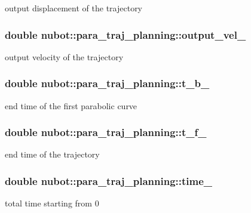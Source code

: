 output displacement of the trajectory 

\hypertarget{group__nubot_gae57f0165c2b073b880bf4827bdd76204}{
\subsubsection[{output\-\_\-vel\-\_\-}]{\setlength{\rightskip}{0pt plus 5cm}double nubot\-::para\-\_\-traj\-\_\-planning\-::output\-\_\-vel\-\_\-\hspace{0.3cm}{\ttfamily [private]}}}\label{group__nubot_gae57f0165c2b073b880bf4827bdd76204}


output velocity of the trajectory 

\hypertarget{group__nubot_ga89b8a9abfcb47b34ac861127fe26b8ca}{
\subsubsection[{t\-\_\-b\-\_\-}]{\setlength{\rightskip}{0pt plus 5cm}double nubot\-::para\-\_\-traj\-\_\-planning\-::t\-\_\-b\-\_\-\hspace{0.3cm}{\ttfamily [private]}}}\label{group__nubot_ga89b8a9abfcb47b34ac861127fe26b8ca}


end time of the first parabolic curve 

\hypertarget{group__nubot_ga9c93d92b950dcb6f34b3c3b843aad823}{
\subsubsection[{t\-\_\-f\-\_\-}]{\setlength{\rightskip}{0pt plus 5cm}double nubot\-::para\-\_\-traj\-\_\-planning\-::t\-\_\-f\-\_\-\hspace{0.3cm}{\ttfamily [private]}}}\label{group__nubot_ga9c93d92b950dcb6f34b3c3b843aad823}


end time of the trajectory 

\hypertarget{group__nubot_ga06fe0c4fbd1afaa2a33672a85705410a}{
\subsubsection[{time\-\_\-}]{\setlength{\rightskip}{0pt plus 5cm}double nubot\-::para\-\_\-traj\-\_\-planning\-::time\-\_\-\hspace{0.3cm}{\ttfamily [private]}}}\label{group__nubot_ga06fe0c4fbd1afaa2a33672a85705410a}


total time starting from 0 


